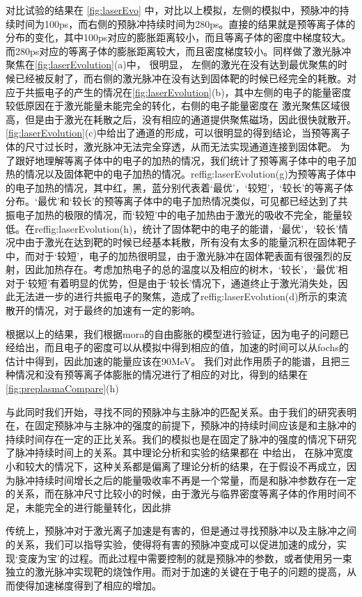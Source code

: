对比试验的结果在 \ref{fig:laserEvo} 中，对比以上模拟，左侧的模拟中，预脉冲的持续时间为100ps，而右侧的预脉冲持续时间为280ps。直接的结果就是预等离子体的分布的变化，其中100ps对应的膨胀距离较小，而且等离子体的密度中梯度较大。而280ps对应的等离子体的膨胀距离较大，而且密度梯度较小。同样做了激光脉冲聚焦在\ref{fig:laserEvolution}(a)中， 很明显， 左侧的激光在没有达到最优聚焦的时候已经被反射了，而右侧的激光脉冲在没有达到固体靶的时候已经完全的耗散。对应于共振电子的产生的情况在\ref{fig:laserEvolution}(b)，其中左侧的电子的能量密度较低原因在于激光能量未能完全的转化，右侧的电子能量密度在 激光聚焦区域很高，但是由于激光在耗散之后，没有相应的通道提供聚焦磁场，因此很快就散开。\ref{fig:laserEvolution}(c)中给出了通道的形成，可以很明显的得到结论，当预等离子体的尺寸过长时，激光脉冲无法完全穿透，从而无法实现通道连接到固体靶。 为了跟好地理解等离子体中的电子的加热的情况，我们统计了预等离子体中的电子加热的情况以及固体靶中的电子加热的情况。ref{fig:laserEvolution}(g)为预等离子体中的电子加热的情况，其中红，黑，蓝分别代表着‘最优’，‘较短’，‘较长’的等离子体分布。‘最优’和‘较长’的预等离子体中的电子加热情况类似，可见都已经达到了共振电子加热的极限的情况，而‘较短’中的电子加热由于激光的吸收不完全，能量较低。在ref{fig:laserEvolution}(h)，统计了固体靶中的电子的能谱，‘最优’，‘较长’情况中由于激光在达到靶的时候已经基本耗散，所有没有太多的能量沉积在固体靶子中，而对于‘较短’，电子的加热很明显，由于激光脉冲在固体靶表面有很强烈的反射，因此加热存在。考虑加热电子的总的温度以及相应的树木，‘较长’，‘最优’相对于‘较短’有着明显的优势，但是由于‘较长’情况下，通道终止于激光消失处，因此无法进一步的进行共振电子的聚焦，造成了ref{fig:laserEvolution}(d)所示的束流散开的情况，对于最终的加速有一定的影响。




根据以上的结果，我们根据mora的自由膨胀的模型进行验证，因为电子的问题已经给出，而且电子的密度可以从模拟中得到相应的值，加速的时间可以从fochs的估计中得到，因此加速的能量应该在90MeV。 我们对此作用质子的能谱，且把三种情况和没有预等离子体膨胀的情况进行了相应的对比，得到的结果在\ref{fig:preplasmaCompare}(h)



与此同时我们开始，寻找不同的预脉冲与主脉冲的匹配关系。由于我们的研究表明在，在固定预脉冲与主脉冲的强度的前提下，预脉冲的持续时间应该是和主脉冲的持续时间存在一定的正比关系。我们的模拟也是在固定了脉冲的强度的情况下研究了脉冲持续时间上的关系。其中理论分析和实验的结果都在 中给出， 在脉冲宽度小和较大的情况下，这种关系都是偏离了理论分析的结果，在于假设不再成立，因为脉冲持续时间增长之后的能量吸收率不再是一个常量，而是和脉冲参数存在一定的关系，而在脉冲尺寸比较小的时候，由于激光与临界密度等离子体的作用时间不足，未能完全的进行能量转化，因此排




传统上，预脉冲对于激光离子加速是有害的，但是通过寻找预脉冲以及主脉冲之间的关系，我们可以指导实验，使得将有害的预脉冲变成可以促进加速的成分，实现‘变废为宝’的过程。而此过程中需要控制的就是预脉冲的参数，或者使用另一束独立的激光脉冲实现靶的烧蚀作用。而对于加速的关键在于电子的问题的提高，从而使得加速梯度得到了相应的增加。


